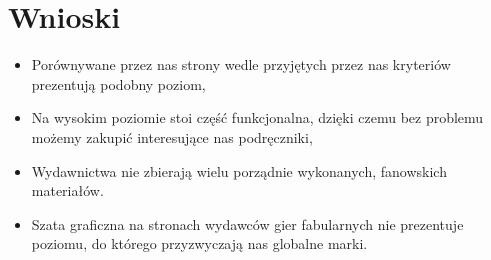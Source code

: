 \documentclass[a4paper,11pt]{article}
\begin{document}
\section {Wnioski}
\begin{itemize}
	\item Porównywane przez nas strony wedle przyjętych przez nas kryteriów prezentują podobny poziom,
	\item Na wysokim poziomie stoi część funkcjonalna, dzięki czemu bez problemu możemy zakupić interesujące nas podręczniki,
	\item Wydawnictwa nie zbierają wielu porządnie wykonanych, fanowskich materiałów.
	\item Szata graficzna na stronach wydawców gier fabularnych nie prezentuje poziomu, do którego przyzwyczają nas globalne marki.
\end{itemize} 
\end{document}
